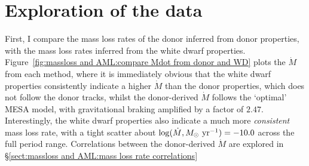 \section{Exploration of the data}
\label{sect:massloss and AML:exploring massloss data}

First, I compare the mass loss rates of the donor inferred from donor properties, with the mass loss rates inferred from the white dwarf properties. Figure~\ref{fig:massloss and AML:compare Mdot from donor and WD} plots the $\dot M$ from each method, where it is immediately obvious that the white dwarf properties consistently indicate a higher $\dot M$ than the donor properties, which does not follow the donor tracks, whilst the donor-derived $\dot M$ follows the `optimal' MESA model, with gravitational braking amplified by a factor of $2.47$. Interestingly, the white dwarf properties also indicate a much more \textit{consistent} mass loss rate, with a tight scatter about $\log (\dot M, M_\odot\ {\rm yr}^{-1}) = -10.0$ across the full period range. Correlations between the donor-derived $\dot M$ are explored in \S\ref{sect:massloss and AML:mass loss rate correlations}

